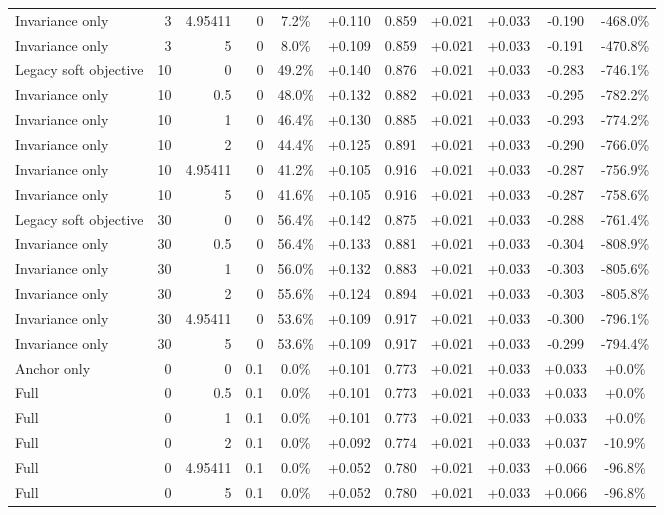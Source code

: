 \begin{table}[htbp]
\begin{tabular}{lrrrccccccc}
Invariance only & 3 & 4.95411 & 0 & 7.2\% & +0.110 & 0.859 & +0.021 & +0.033 & -0.190 & -468.0\% \\
Invariance only & 3 & 5 & 0 & 8.0\% & +0.109 & 0.859 & +0.021 & +0.033 & -0.191 & -470.8\% \\
Legacy soft objective & 10 & 0 & 0 & 49.2\% & +0.140 & 0.876 & +0.021 & +0.033 & -0.283 & -746.1\% \\
Invariance only & 10 & 0.5 & 0 & 48.0\% & +0.132 & 0.882 & +0.021 & +0.033 & -0.295 & -782.2\% \\
Invariance only & 10 & 1 & 0 & 46.4\% & +0.130 & 0.885 & +0.021 & +0.033 & -0.293 & -774.2\% \\
Invariance only & 10 & 2 & 0 & 44.4\% & +0.125 & 0.891 & +0.021 & +0.033 & -0.290 & -766.0\% \\
Invariance only & 10 & 4.95411 & 0 & 41.2\% & +0.105 & 0.916 & +0.021 & +0.033 & -0.287 & -756.9\% \\
Invariance only & 10 & 5 & 0 & 41.6\% & +0.105 & 0.916 & +0.021 & +0.033 & -0.287 & -758.6\% \\
Legacy soft objective & 30 & 0 & 0 & 56.4\% & +0.142 & 0.875 & +0.021 & +0.033 & -0.288 & -761.4\% \\
Invariance only & 30 & 0.5 & 0 & 56.4\% & +0.133 & 0.881 & +0.021 & +0.033 & -0.304 & -808.9\% \\
Invariance only & 30 & 1 & 0 & 56.0\% & +0.132 & 0.883 & +0.021 & +0.033 & -0.303 & -805.6\% \\
Invariance only & 30 & 2 & 0 & 55.6\% & +0.124 & 0.894 & +0.021 & +0.033 & -0.303 & -805.8\% \\
Invariance only & 30 & 4.95411 & 0 & 53.6\% & +0.109 & 0.917 & +0.021 & +0.033 & -0.300 & -796.1\% \\
Invariance only & 30 & 5 & 0 & 53.6\% & +0.109 & 0.917 & +0.021 & +0.033 & -0.299 & -794.4\% \\
Anchor only & 0 & 0 & 0.1 & 0.0\% & +0.101 & 0.773 & +0.021 & +0.033 & +0.033 & +0.0\% \\
Full & 0 & 0.5 & 0.1 & 0.0\% & +0.101 & 0.773 & +0.021 & +0.033 & +0.033 & +0.0\% \\
Full & 0 & 1 & 0.1 & 0.0\% & +0.101 & 0.773 & +0.021 & +0.033 & +0.033 & +0.0\% \\
Full & 0 & 2 & 0.1 & 0.0\% & +0.092 & 0.774 & +0.021 & +0.033 & +0.037 & -10.9\% \\
Full & 0 & 4.95411 & 0.1 & 0.0\% & +0.052 & 0.780 & +0.021 & +0.033 & +0.066 & -96.8\% \\
Full & 0 & 5 & 0.1 & 0.0\% & +0.052 & 0.780 & +0.021 & +0.033 & +0.066 & -96.8\% \\

\end{tabular}
\end{table}
